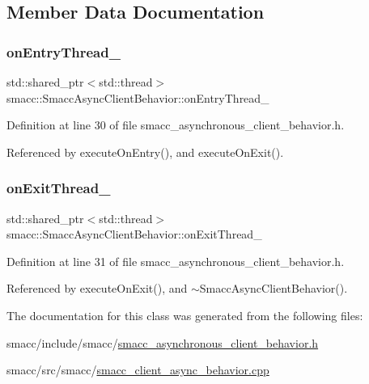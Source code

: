 \subsection{Member Data Documentation}
\mbox{\label{classsmacc_1_1SmaccAsyncClientBehavior_a8b7bacf092d8b4de0bb3764bae43c181}} 
\subsubsection{\texorpdfstring{on\+Entry\+Thread\+\_\+}{onEntryThread\_}}
{\footnotesize\ttfamily std\+::shared\+\_\+ptr$<$std\+::thread$>$ smacc\+::\+Smacc\+Async\+Client\+Behavior\+::on\+Entry\+Thread\+\_\+\hspace{0.3cm}{\ttfamily [private]}}



Definition at line 30 of file smacc\+\_\+asynchronous\+\_\+client\+\_\+behavior.\+h.



Referenced by execute\+On\+Entry(), and execute\+On\+Exit().

\mbox{\label{classsmacc_1_1SmaccAsyncClientBehavior_af2e2b5e95d8281c605fa06e51aad5d00}} 
\subsubsection{\texorpdfstring{on\+Exit\+Thread\+\_\+}{onExitThread\_}}
{\footnotesize\ttfamily std\+::shared\+\_\+ptr$<$std\+::thread$>$ smacc\+::\+Smacc\+Async\+Client\+Behavior\+::on\+Exit\+Thread\+\_\+\hspace{0.3cm}{\ttfamily [private]}}



Definition at line 31 of file smacc\+\_\+asynchronous\+\_\+client\+\_\+behavior.\+h.



Referenced by execute\+On\+Exit(), and $\sim$\+Smacc\+Async\+Client\+Behavior().



The documentation for this class was generated from the following files\+:\begin{DoxyCompactItemize}
\item 
smacc/include/smacc/\hyperlink{smacc__asynchronous__client__behavior_8h}{smacc\+\_\+asynchronous\+\_\+client\+\_\+behavior.\+h}\item 
smacc/src/smacc/\hyperlink{smacc__client__async__behavior_8cpp}{smacc\+\_\+client\+\_\+async\+\_\+behavior.\+cpp}\end{DoxyCompactItemize}
